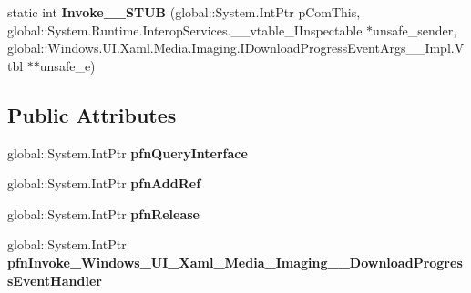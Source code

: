 \begin{DoxyCompactItemize}
\item 
\mbox{\label{struct_windows_1_1_u_i_1_1_xaml_1_1_media_1_1_imaging_1_1_download_progress_event_handler_____impl_1_1_vtbl_a7f25f3b94723e44f95176df16fa94d75}} 
static int {\bfseries Invoke\+\_\+\+\_\+\+S\+T\+UB} (global\+::\+System.\+Int\+Ptr p\+Com\+This, global\+::\+System.\+Runtime.\+Interop\+Services.\+\_\+\+\_\+vtable\+\_\+\+I\+Inspectable $\ast$unsafe\+\_\+sender, global\+::\+Windows.\+U\+I.\+Xaml.\+Media.\+Imaging.\+I\+Download\+Progress\+Event\+Args\+\_\+\+\_\+\+Impl.\+Vtbl $\ast$$\ast$unsafe\+\_\+e)
\end{DoxyCompactItemize}
\subsection*{Public Attributes}
\begin{DoxyCompactItemize}
\item 
\mbox{\label{struct_windows_1_1_u_i_1_1_xaml_1_1_media_1_1_imaging_1_1_download_progress_event_handler_____impl_1_1_vtbl_a70802e8cb056236c0c209b1e4a4483da}} 
global\+::\+System.\+Int\+Ptr {\bfseries pfn\+Query\+Interface}
\item 
\mbox{\label{struct_windows_1_1_u_i_1_1_xaml_1_1_media_1_1_imaging_1_1_download_progress_event_handler_____impl_1_1_vtbl_ae9ee206d98378937bf813cbf694523a8}} 
global\+::\+System.\+Int\+Ptr {\bfseries pfn\+Add\+Ref}
\item 
\mbox{\label{struct_windows_1_1_u_i_1_1_xaml_1_1_media_1_1_imaging_1_1_download_progress_event_handler_____impl_1_1_vtbl_af484b512359dde17bd92b26d16ad7ebc}} 
global\+::\+System.\+Int\+Ptr {\bfseries pfn\+Release}
\item 
\mbox{\label{struct_windows_1_1_u_i_1_1_xaml_1_1_media_1_1_imaging_1_1_download_progress_event_handler_____impl_1_1_vtbl_a3d991c2cd5471ed7a7bb35ec736f72d0}} 
global\+::\+System.\+Int\+Ptr {\bfseries pfn\+Invoke\+\_\+\+Windows\+\_\+\+U\+I\+\_\+\+Xaml\+\_\+\+Media\+\_\+\+Imaging\+\_\+\+\_\+\+Download\+Progress\+Event\+Handler}
\end{DoxyCompactItemize}
